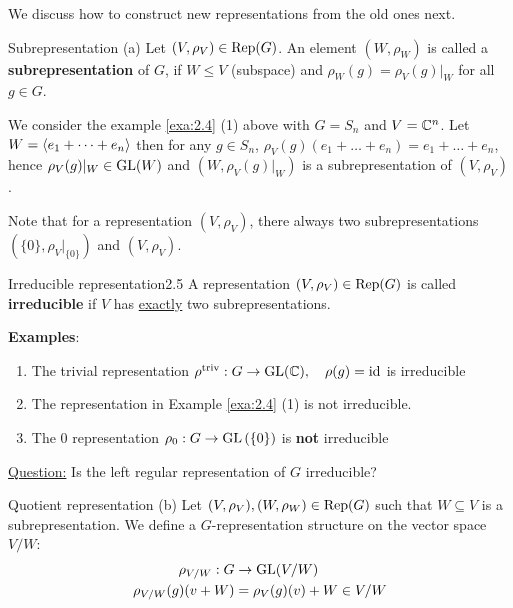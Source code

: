 \documentclass[twoside = false,	%
		headsepline,		%
		parskip = true,
		]{scrbook}						%
\begin{document}

        We discuss how to construct new representations from the old ones next.
        
        \begin{definition*}{Subrepresentation (a)}
            Let $(V,\rho_V) \in \mathrm{Rep}(G)$. An element $(W,\rho_W)$ is called a \textbf{subrepresentation} of $G$, if $W \leq V$ (subspace) and $\rho_W(g) = \rho_V(g)|_W$ for all $g \in G$.
        \end{definition*}
        
        We consider the example \ref{exa:2.4} (1) above with $G=S_n$ and $V=\mathbb C^n$. Let $W = \left\langle e_1 + \dots + e_n\right\rangle$ then for any $g \in S_n$, $\rho_V(g)(e_1 + \dots + e_n) = e_1 + \dots + e_n$, hence $\rho_V(g)|_W \in \mathrm{GL}(W)$ and $(W,\rho_V(g)|_W)$ is a subrepresentation of $(V,\rho_V)$.
        
        Note that for a representation $(V,\rho_V)$, there always two subrepresentations $(\{0\},\rho_V|_{\{0\}})$ and $(V,\rho_V)$.
        
        
        \begin{definition}{Irreducible representation}{2.5}
            A representation $(V,\rho_V) \in \mathrm{Rep}(G)$ is called \textbf{irreducible} if $V$ has \underline{exactly} two subrepresentations.
        \end{definition}
        
        \textbf{Examples}:
        \begin{enumerate}
            \item The trivial representation $\rho^{\text{triv}}: G \to \mathrm{GL}(\mathbb C), \quad \rho(g) = \mathrm{id} $ is irreducible
            \item The representation in Example \ref{exa:2.4} (1) is not irreducible.
            \item The $0$ representation $\rho_{0}: G \to \mathrm{GL}\left( \{0\}\right)$ is \textbf{not} irreducible
        \end{enumerate}
    
    \underline{Question:} Is the left regular representation of $G$ irreducible?
    \begin{definition*}
    {Quotient representation (b)}
        Let $(V,\rho_V), (W,\rho_W) \in \mathrm{Rep}(G)$ such that $W \subseteq V$ is a subrepresentation. We define a $G$-representation structure on the vector space $V/W:$
        \begin{equation*}
        \begin{split}
            \rho_{V/W}: G &\to \mathrm{GL}(V/W) \\
                        \rho_{V/W}(g)(v+W) &= \rho_V(g)(v) + W \in V/W
        \end{split}
        \end{equation*}
    \end{definition*}
    
\end{document}
